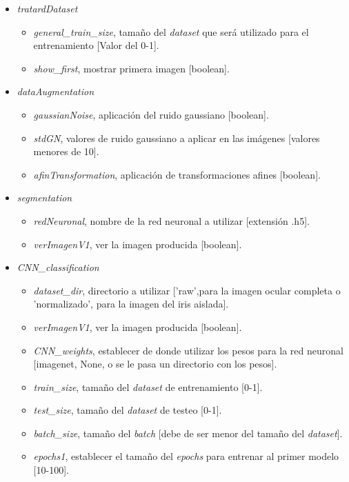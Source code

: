{\begin{itemize}
    \item \textit{tratardDataset}
    \begin{itemize}
        \item \textit{general\_train\_size}, tamaño del \textit{dataset} que será utilizado para el entrenamiento [Valor del 0-1].
        \item \textit{show\_first}, mostrar primera imagen [boolean].
    \end{itemize}
    \item \textit{dataAugmentation}
    \begin{itemize}
        \item \textit{gaussianNoise}, aplicación del ruido gaussiano [boolean].
        \item \textit{stdGN}, valores de ruido gaussiano a aplicar en las imágenes [valores menores de 10].
        \item \textit{afinTransformation}, aplicación de transformaciones afines [boolean].
    \end{itemize}
    \item \textit{segmentation}
    \begin{itemize}
        \item \textit{redNeuronal}, nombre de la red neuronal a utilizar [extensión .h5].
        \item \textit{verImagenV1}, ver la imagen producida [boolean].
    \end{itemize}
    \item \textit{CNN\_classification}
    \begin{itemize}
        \item \textit{dataset\_dir}, directorio a utilizar ['raw',para la imagen ocular completa o 'normalizado', para la imagen del iris aislada].
        \item \textit{verImagenV1}, ver la imagen producida [boolean].
        \item \textit{CNN\_weights}, establecer de donde utilizar los pesos para la red neuronal [imagenet, None, o se le pasa un directorio con los pesos].
        \item \textit{train\_size}, tamaño del \textit{dataset} de entrenamiento [0-1].
        \item \textit{test\_size}, tamaño del \textit{dataset} de testeo [0-1].
        \item \textit{batch\_size}, tamaño del \textit{batch} [debe de ser menor del tamaño del \textit{dataset}].
        \item \textit{epochs1}, establecer el tamaño del \textit{epochs} para entrenar al primer modelo [10-100].

\end{itemize}
\end{itemize}}
